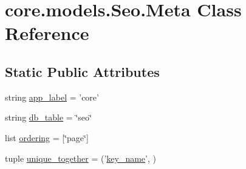 \hypertarget{classcore_1_1models_1_1Seo_1_1Meta}{\section{core.\-models.\-Seo.\-Meta Class Reference}
\label{classcore_1_1models_1_1Seo_1_1Meta}
}
\subsection*{Static Public Attributes}
\begin{DoxyCompactItemize}
\item 
string \hyperlink{classcore_1_1models_1_1Seo_1_1Meta_a8cd0ac3453f824e5d72581939b23e90d}{app\-\_\-label} = 'core'
\item 
string \hyperlink{classcore_1_1models_1_1Seo_1_1Meta_a6206feb5b4c17c296aea40c1605e8aa4}{db\-\_\-table} = \char`\"{}seo\char`\"{}
\item 
list \hyperlink{classcore_1_1models_1_1Seo_1_1Meta_a5f2ba1b707cae6e343548641be5c1f74}{ordering} = \mbox{[}\char`\"{}page\char`\"{}\mbox{]}
\item 
tuple \hyperlink{classcore_1_1models_1_1Seo_1_1Meta_a421bce50927c1396960f5f9283e32ff6}{unique\-\_\-together} = ('\hyperlink{classcore_1_1models_1_1Seo_a644a0f17aaa68dc004c064e4f8be688d}{key\-\_\-name}', )
\end{DoxyCompactItemize}


